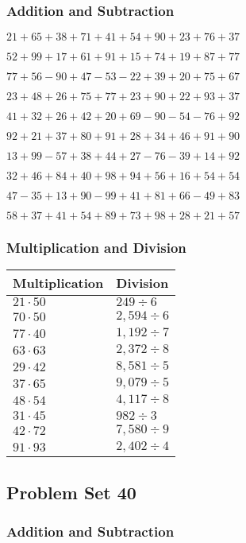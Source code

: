 \hypertarget{addition-and-subtraction-79}{%
\subsubsection{Addition and
Subtraction}\label{addition-and-subtraction-79}}

\(21+65+38+71+41+54+90+23+76+ 37\)

\(52+99+17+61+91+15+74+19+87+77\)

\(77+56-90+47-53-22+39+20+75+67\)

\(23+48+26+75+77+23+90+22+93+37\)

\(41+32+26+42+20+69-90-54-76+92\)

\(92+21+37+80+91+28+34+46+91+90\)

\(13+99-57+38+44+27-76-39+14+92\)

\(32+46+84+40+98+94+56+16+54+54\)

\(47-35+13+90-99+41+81+66-49+83\)

\(58+37+41+54+89+73+98+28+21+57\)

\hypertarget{multiplication-and-division-79}{%
\subsubsection{Multiplication and
Division}\label{multiplication-and-division-79}}

\begin{longtable}[]{@{}ll@{}}
\toprule
Multiplication & Division\tabularnewline
\midrule
\endhead
\(21\cdot50\) & \(249÷6\)\tabularnewline
\(70\cdot50\) & \(2,594÷6\)\tabularnewline
\(77\cdot40\) & \(1,192÷7\)\tabularnewline
\(63\cdot63\) & \(2,372÷8\)\tabularnewline
\(29\cdot42\) & \(8,581÷5\)\tabularnewline
\(37\cdot65\) & \(9,079÷5\)\tabularnewline
\(48\cdot54\) & \(4,117 ÷8\)\tabularnewline
\(31\cdot45\) & \(982÷3\)\tabularnewline
\(42\cdot72\) & \(7,580÷9\)\tabularnewline
\(91\cdot93\) & \(2,402÷4\)\tabularnewline
\bottomrule
\end{longtable}

\hypertarget{problem-set-40-1}{%
\subsection{Problem Set 40}\label{problem-set-40-1}}

\hypertarget{addition-and-subtraction-80}{%
\subsubsection{Addition and
Subtraction}\label{addition-and-subtraction-80}}

